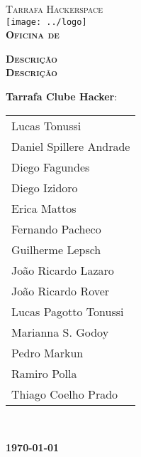 \begin{titlepage}
\begin{center}

\textsc{\large Tarrafa Hackerspace}\\[1cm]

\texttt{[image: ../logo]}\\[1.5cm]

\textsc{\LARGE \bfseries Oficina de \\ [1.3cm]}

\textsc{\LARGE \bfseries Descrição \\ Descrição \\ [2cm]}


\begin{Large}
\textbf{Tarrafa Clube Hacker}:
\begin{tabular}{|l}
Lucas Tonussi \\
Daniel Spillere Andrade \\
Diego Fagundes \\
Diego Izidoro \\
Erica Mattos \\
Fernando Pacheco \\
Guilherme Lepsch \\
João Ricardo Lazaro \\
João Ricardo Rover \\
Lucas Pagotto Tonussi \\
Marianna S. Godoy \\
Pedro Markun \\
Ramiro Polla \\
Thiago Coelho Prado \\
\end{tabular} \\ [0.5cm]
\end{Large}

\vfill

\textbf{\today}

\end{center}
\end{titlepage}
